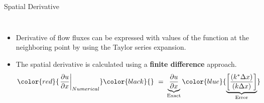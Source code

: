 \begin{frame}{Spatial Derivative}
  \begin{columns}
    \begin{itemize}
      \item Derivative of flow fluxes can be expressed with values of the function at the 
            neighboring point by using the Taylor series expansion.  
      \item The spatial derivative is calculated using a \textbf{finite difference} approach.
      \begin{equation*}
		    \begin{split}
			    \color{red}{\left.\frac{\partial{u}}{\partial{x}}\right|_{Numerical}}\color{black}{}~=&~
            \underbrace{\frac{\partial{u}}{\partial{x}}}_{\text{Exact}}\color{blue}
            {\underbrace{\left[\frac{\left(k^*\Delta{x}\right)}{\left(k\Delta{x}\right)}\right]}_{
            \text{Error}}}
		    \end{split}
		  \end{equation*}
    \end{itemize}
		\begin{figure}[htbp!]
		  \begin{center}
    	  \includegraphics[width=1.0\textwidth]{Figures/Phase_Speed.eps}
    	\end{center}
		\end{figure} 
  \end{columns}
\end{frame}

